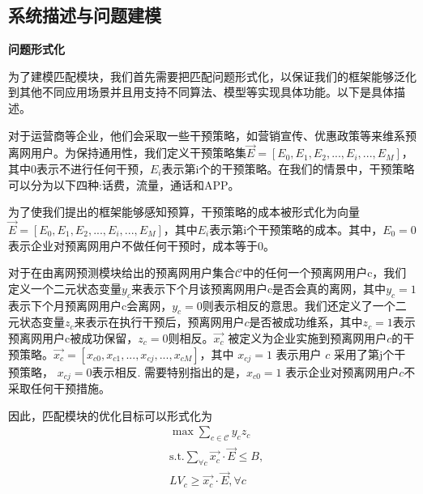 \newpage

\subsection{系统描述与问题建模}
\textbf{问题形式化}\par
为了建模匹配模块，我们首先需要把匹配问题形式化，以保证我们的框架能够泛化到其他不同应用场景并且用支持不同算法、模型等实现具体功能。以下是具体描述。\par
对于运营商等企业，他们会采取一些干预策略，如营销宣传、优惠政策等来维系预离网用户。为保持通用性，我们定义干预策略集$\vec{E} = [E_{0}, E_{1}, E_{2}, ..., E_{i},..., E_{M}]$，其中$0$表示不进行任何干预，$E_{i}$表示第i个的干预策略。在我们的情景中，干预策略可以分为以下四种:话费，流量，通话和APP。\par
为了使我们提出的框架能够感知预算，干预策略的成本被形式化为向量$\vec{E} = [E_{0}, E_{1}, E_{2}, ..., E_{i},..., E_{M}]$，其中$E_{i}$表示第i个干预策略的成本。其中，$E_{0} = 0$表示企业对预离网用户不做任何干预时，成本等于0。\par
对于在由离网预测模块给出的预离网用户集合$\mathcal{C}$中的任何一个预离网用户c，我们定义一个二元状态变量$y_{c}$来表示下个月该预离网用户c是否会真的离网，其中$y_{c}=1$表示下个月预离网用户c会离网，$y_{c}=0$则表示相反的意思。我们还定义了一个二元状态变量$z_{c}$来表示在执行干预后，预离网用户$c$是否被成功维系，其中$z_{c} = 1$表示预离网用户c被成功保留，$z_{c} = 0$则相反。$\vec{x_{c}}$ 被定义为企业实施到预离网用户$c$的干预策略。$\vec{x_{c}} = [x_{c0}, x_{c1}, ..., x_{cj}, ..., x_{cM}]$，其中 $x_{cj}=1$ 表示用户 $c$ 采用了第j个干预策略， $x_{cj}=0$表示相反. 需要特别指出的是，$x_{c0}=1$ 表示企业对预离网用户$c$不采取任何干预措施。\par
因此，匹配模块的优化目标可以形式化为
\begin{equation}
	\begin{aligned}
		& \max \sum_{c \in \mathcal{C}} y_{c}z_{c} \\
		& \mathrm{s.t.} \sum_{\forall c} \vec{x_{c}} \cdot \vec{E} \leq B , \\
		& LV_{c} \geq \vec{x_{c}} \cdot \vec{E}, \forall c			
	\end{aligned}
	\label{Eq:matching-target}
\end{equation}	
